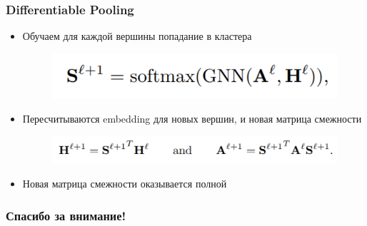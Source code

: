 \documentclass{beamer}
\begin{document}
\begin{frame}
\frametitle{Differentiable Pooling}
\begin{itemize}
	\item Обучаем для каждой вершины попадание в кластера
\begin{figure}
	\includegraphics[width=0.5\columnwidth]{softmax.png}
\end{figure}
	\item Пересчитываются embedding для новых вершин, и новая матрица смежности
	\begin{figure}
		\includegraphics[width=0.8\columnwidth]{differentaible_pooling.png}
	\end{figure}
	\item Новая матрица смежности оказывается полной
\end{itemize}
\end{frame}

\begin{frame}[c]
\begin{center}
\frametitle{\LARGE Спасибо за внимание!}

{\LARGE \inserttitle}

\bigskip

{\insertauthor} 

\bigskip\bigskip

{\insertinstitute}

\bigskip\bigskip

{\large \insertdate}
\end{center}
\end{frame}
\end{document}

